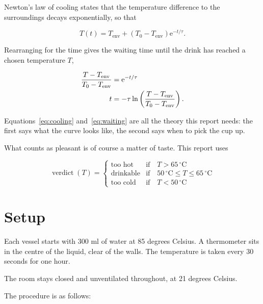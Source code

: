 \documentclass[a4paper,11pt]{article}
\begin{document}
Newton's law of cooling states that the temperature difference to the surroundings decays
exponentially, so that

\begin{equation}
    T(t) = T_\mathrm{env} + \left( T_0 - T_\mathrm{env} \right) \mathrm{e}^{-t/\tau} .
    \label{eq:cooling}
\end{equation}

Rearranging for the time gives the waiting time until the drink has reached a chosen
temperature $T$,

\begin{align}
    \frac{T - T_\mathrm{env}}{T_0 - T_\mathrm{env}}
        &= \mathrm{e}^{-t/\tau} \notag \\
    t &= -\tau \ln \left( \frac{T - T_\mathrm{env}}{T_0 - T_\mathrm{env}} \right) .
    \label{eq:waiting}
\end{align}

Equations~\eqref{eq:cooling} and~\eqref{eq:waiting} are all the theory this report needs:
the first says what the curve looks like, the second says when to pick the cup up.

What counts as pleasant is of course a matter of taste.
This report uses

\[
    \operatorname{verdict}(T) =
    \begin{cases}
        \text{too hot}   & \text{if} \quad T > 65\,^{\circ}\mathrm{C} \\
        \text{drinkable} & \text{if} \quad 50\,^{\circ}\mathrm{C} \leq T \leq 65\,^{\circ}\mathrm{C} \\
        \text{too cold}  & \text{if} \quad T < 50\,^{\circ}\mathrm{C}
    \end{cases}
\]

\section{Setup}\label{sec:setup}

Each vessel starts with 300 ml of water at 85 degrees Celsius.
A thermometer sits in the centre of the liquid, clear of the walls.
The temperature is taken every 30 seconds for one hour.

The room stays closed and unventilated throughout, at 21 degrees Celsius.

The procedure is as follows:
\end{document}
